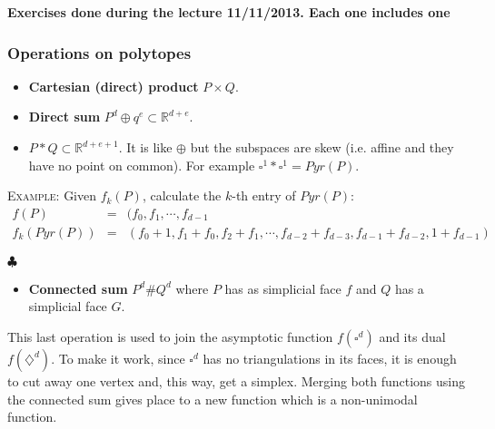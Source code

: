 \bigskip

\textbf{Exercises done during the lecture 11/11/2013. Each one includes one}


\subsubsection{Operations on polytopes}
\begin{itemize}
\item \textbf{Cartesian (direct) product} $P\times Q$.
\item \textbf{Direct sum} $P^d \oplus q^e \subset \mathbb{R}^{d+e}$.
\item $P*Q\subset \mathbb{R}^{d+e+1}$. It is like $\oplus$ but the subspaces are skew (i.e. affine and they have no point on common). For example $\square^1 *\square^1 = Pyr(P)$.
\end{itemize}

\bigskip
\noindent\textsc{Example}: Given $f_k(P)$, calculate the $k$-th entry of $Pyr(P)$:
\begin{eqnarray*}
f(P)&=&(f_0,f_1,\cdots, f_{d-1}\\
f_k(Pyr(P)) &=& (f_0 +1, f_1 + f_0, f_2+f_1, \cdots, f_{d-2}+ f_{d-3}, f_{d-1}+ f_{d-2}, 1+ f_{d-1})
\end{eqnarray*}
\begin{flushright}
$\clubsuit$
\end{flushright}

\bigskip
\begin{itemize}
\item  \textbf{Connected sum} $P^d\#Q^d$ where $P$ has as simplicial face $f$ and $Q$ has a simplicial face $G$. 
\end{itemize}

This last operation is used to join the asymptotic function $f(\square^d)$ and its dual $f(\diamondsuit ^d)$. To make it work, since $\square^d$ has no triangulations in its faces, it is enough to cut away one vertex and, this way, get a simplex. Merging both functions using the connected sum gives place to a new function which is a non-unimodal function.

